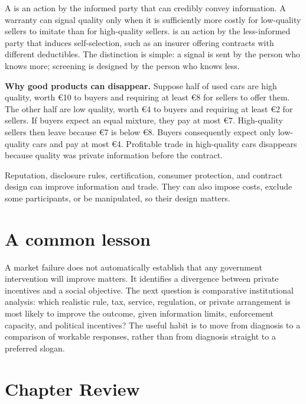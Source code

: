 A  is an action by the informed party that can credibly convey
information. A warranty can signal quality only when it is sufficiently more
costly for low-quality sellers to imitate than for high-quality sellers.
 is an action by the less-informed party that induces
self-selection, such as an insurer offering contracts with different
deductibles. The distinction is simple: a signal is sent by the person who
knows more; screening is designed by the person who knows less.

\begin{exercisebox}
\textbf{Why good products can disappear.}
Suppose half of used cars are high quality, worth \euro10 to buyers and
requiring at least \euro8 for sellers to offer them. The other half are low
quality, worth \euro4 to buyers and requiring at least \euro2 for sellers. If
buyers expect an equal mixture, they pay at most \euro7. High-quality sellers
then leave because \euro7 is below \euro8. Buyers consequently expect only
low-quality cars and pay at most \euro4. Profitable trade in high-quality cars
disappears because quality was private information before the contract.
\end{exercisebox}

Reputation, disclosure rules, certification, consumer protection, and contract
design can improve information and trade. They can also impose costs, exclude
some participants, or be manipulated, so their design matters.

\section{A common lesson}

A market failure does not automatically establish that any government
intervention will improve matters. It identifies a divergence between private
incentives and a social objective. The next question is comparative
institutional analysis: which realistic rule, tax, service, regulation, or
private arrangement is most likely to improve the outcome, given information
limits, enforcement capacity, and political incentives? The useful habit is
to move from diagnosis to a comparison of workable responses, rather than
from diagnosis straight to a preferred slogan.

\section*{Chapter Review}

